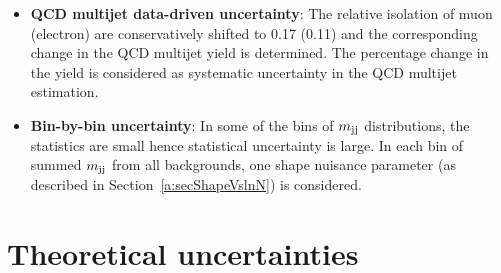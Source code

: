 \begin{itemize}[leftmargin=*]
\item {\bf {QCD multijet data-driven uncertainty}}: The relative isolation of muon (electron) 
	are conservatively shifted to 0.17 (0.11) and the corresponding change in the 
	QCD multijet yield is determined. The percentage change in the yield is considered as 
	systematic uncertainty in the QCD multijet estimation.
 
\item {\bf {Bin-by-bin uncertainty}}: In some of the bins of $m_\text{jj}$ distributions, 
	the statistics are small hence statistical uncertainty is large. In each bin of 
	summed $m_\text{jj}$ from all backgrounds, one shape nuisance parameter (as described in 
	Section~\ref{a:secShapeVslnN}) is considered.
\end{itemize}

\section{Theoretical uncertainties}
